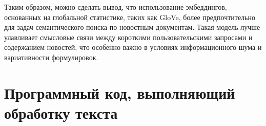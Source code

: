 \documentclass[coursework]{SCWorks}
\begin{document}
Таким образом, можно сделать вывод, что использование эмбеддингов, основанных на глобальной статистике, таких как GloVe, более предпочтительно для задач семантического поиска по новостным документам. Такая модель лучше улавливает смысловые связи между короткими пользовательскими запросами и содержанием новостей, что особенно важно в условиях информационного шума и вариативности формулировок.




\appendix
\section{Программный код, выполняющий обработку текста}
\label{apx:tokenization}
\end{document}
